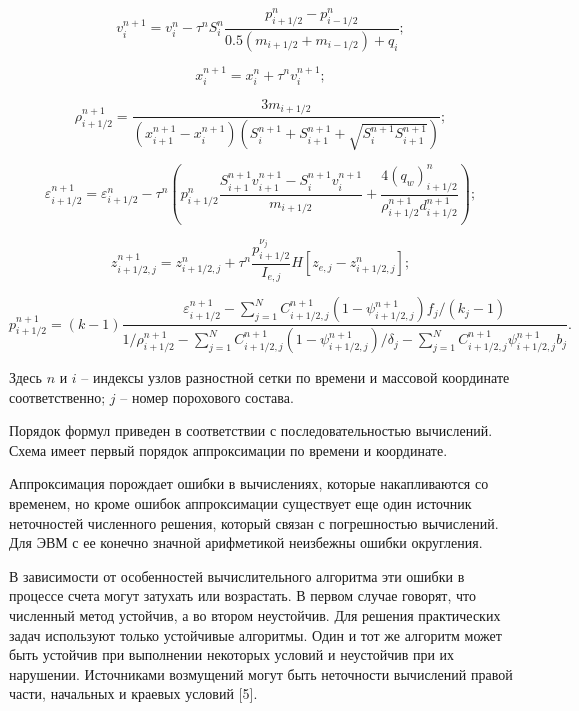 \documentclass[14pt, a4paper]{extreport} %
\begin{document}
\begin{equation}
v_i^{n+1} = v_i^n - \tau^n S_i^n \frac{p_{i+1/2}^n - p_{i-1/2}^n}{0.5 (m_{i+1/2} + m_{i-1/2}) + q_i};
\end{equation}

\begin{equation}
x_i^{n+1} = x_i^n + \tau^n v_i^{n+1};
\end{equation}

\begin{equation}
\rho_{i+1/2}^{n+1} = \frac{3m_{i+1/2}}{(x_{i+1}^{n+1} - x_i^{n+1}) (S_i^{n+1} + S_{i+1}^{n+1} + \sqrt{S_i^{n+1} S_{i+1}^{n+1}})};
\end{equation}

\begin{equation}
\varepsilon_{i+1/2}^{n+1} = \varepsilon_{i+1/2}^n - \tau^n \left( p_{i+1/2}^n \frac{S_{i+1}^{n+1} v_{i+1}^{n+1} - S_i^{n+1} v_i^{n+1}}{m_{i+1/2}} + \frac{4(q_w)_{i+1/2}^n}{\rho_{i+1/2}^{n+1} d_{i+1/2}^{n+1}} \right);
\end{equation}

\begin{equation}
z_{i+1/2,j}^{n+1} = z_{i+1/2,j}^n + \tau^n \frac{p_{i+1/2}^{\nu_j}}{I_{e,j}} H [z_{e,j} - z_{i+1/2,j}^n];
\end{equation}

\begin{equation}
p_{i+1/2}^{n+1} = (k-1) \frac{\varepsilon_{i+1/2}^{n+1} - \sum_{j=1}^N C_{i+1/2,j}^{n+1} (1 - \psi_{i+1/2,j}^{n+1}) f_j / (k_j - 1)}{1/\rho_{i+1/2}^{n+1} - \sum_{j=1}^N C_{i+1/2,j}^{n+1} (1 - \psi_{i+1/2,j}^{n+1}) / \delta_j - \sum_{j=1}^N C_{i+1/2,j}^{n+1} \psi_{i+1/2,j}^{n+1} b_j}.
\end{equation}

Здесь \( n \) и \( i \) -- индексы узлов разностной сетки по времени и массовой координате соответственно; \( j \) -- номер порохового состава.

Порядок формул приведен в соответствии с последовательностью вычислений. Схема имеет первый порядок аппроксимации по времени и координате.

Аппроксимация порождает ошибки в вычислениях, которые накапливаются со временем, но кроме ошибок аппроксимации существует еще один источник неточностей численного решения, который связан с погрешностью вычислений. Для ЭВМ с ее конечно значной арифметикой неизбежны ошибки округления.

В зависимости от особенностей вычислительного алгоритма эти ошибки в процессе счета могут затухать или возрастать. В первом случае говорят, что численный метод устойчив, а во втором неустойчив. Для решения практических задач используют только устойчивые алгоритмы. Один и тот же алгоритм может быть устойчив при выполнении некоторых условий и неустойчив при их нарушении. Источниками возмущений могут быть неточности вычислений правой части, начальных и краевых условий [5].
\end{document}
